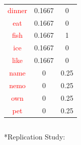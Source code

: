\documentclass{beamer}
\begin{document}
\begin{frame}
{\begin{columns}
\begin{tabular}{ |c||c|c|  }
 				\textcolor{red}{dinner}& 0.1667& 0 \\
 				\textcolor{red}{eat}& 0.1667& 0 \\
 				\textcolor{red}{fish}& 0.1667& 1 \\
 				\textcolor{red}{ice}& 0.1667& 0 \\
 				\textcolor{red}{like}& 0.1667& 0 \\
 				\textcolor{red}{name}& 0& 0.25 \\
 				\textcolor{red}{nemo}& 0& 0.25 \\
 				\textcolor{red}{own}& 0& 0.25\\
 				\textcolor{red}{pet}& 0& 0.25 \\
 				\hline
 			\end{tabular} 
		\end{columns}
		\normalsize{*Replication Study:}
}
\end{frame}
\end{document}
